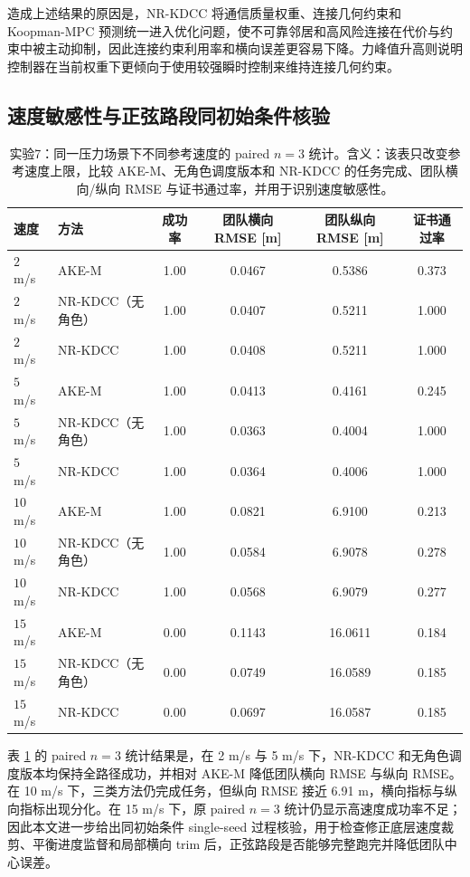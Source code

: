 \documentclass[twocolumn,3p,times,procedia]{elsarticle}
\newif\ifNRReview
\newcommand{\reviewblock}[1]{\ifNRReview\par\smallskip\noindent\begingroup\setlength{\fboxsep}{4pt}\colorbox{yellow!35}{\parbox{0.96\linewidth}{\footnotesize\textbf{当前不足：} #1}}\endgroup\par\smallskip\fi}
\newcommand{\AKE}{AKE-M}
\newcommand{\Method}{NR-KDCC}
\begin{document}
造成上述结果的原因是，\Method{} 将通信质量权重、连接几何约束和 Koopman-MPC 预测统一进入优化问题，使不可靠邻居和高风险连接在代价与约束中被主动抑制，因此连接约束利用率和横向误差更容易下降。力峰值升高则说明控制器在当前权重下更倾向于使用较强瞬时控制来维持连接几何约束。
\reviewblock{力峰值在多个场景中高于 \AKE{}，最终稿不能写“受力更小”或“载荷受力更平滑”；需要后续按 $F_x,F_y,M_z$ 分量和力平滑权重继续调。}

\subsection{速度敏感性与正弦路段同初始条件核验}

\begin{table}[!t]
\centering
\caption{实验7：同一压力场景下不同参考速度的 paired $n=3$ 统计。含义：该表只改变参考速度上限，比较 \AKE{}、无角色调度版本和 \Method{} 的任务完成、团队横向/纵向 RMSE 与证书通过率，并用于识别速度敏感性。}
\label{tab:speed_sensitivity}
\footnotesize
\begin{tabular}{llcccc}
\toprule
速度 & 方法 & 成功率 & 团队横向 RMSE [m] & 团队纵向 RMSE [m] & 证书通过率 \\
\midrule
$2$ m/s & \AKE{} & 1.00 & 0.0467 & 0.5386 & 0.373\\
$2$ m/s & \Method{}（无角色） & 1.00 & 0.0407 & 0.5211 & 1.000\\
$2$ m/s & \Method{} & 1.00 & 0.0408 & 0.5211 & 1.000\\
$5$ m/s & \AKE{} & 1.00 & 0.0413 & 0.4161 & 0.245\\
$5$ m/s & \Method{}（无角色） & 1.00 & 0.0363 & 0.4004 & 1.000\\
$5$ m/s & \Method{} & 1.00 & 0.0364 & 0.4006 & 1.000\\
$10$ m/s & \AKE{} & 1.00 & 0.0821 & 6.9100 & 0.213\\
$10$ m/s & \Method{}（无角色） & 1.00 & 0.0584 & 6.9078 & 0.278\\
$10$ m/s & \Method{} & 1.00 & 0.0568 & 6.9079 & 0.277\\
$15$ m/s & \AKE{} & 0.00 & 0.1143 & 16.0611 & 0.184\\
$15$ m/s & \Method{}（无角色） & 0.00 & 0.0749 & 16.0589 & 0.185\\
$15$ m/s & \Method{} & 0.00 & 0.0697 & 16.0587 & 0.185\\
\bottomrule
\end{tabular}
\end{table}

表 \ref{tab:speed_sensitivity} 的 paired $n=3$ 统计结果是，在 2 m/s 与 5 m/s 下，\Method{} 和无角色调度版本均保持全路径成功，并相对 \AKE{} 降低团队横向 RMSE 与纵向 RMSE。在 10 m/s 下，三类方法仍完成任务，但纵向 RMSE 接近 6.91 m，横向指标与纵向指标出现分化。在 15 m/s 下，原 paired $n=3$ 统计仍显示高速度成功率不足；因此本文进一步给出同初始条件 single-seed 过程核验，用于检查修正底层速度裁剪、平衡进度监督和局部横向 trim 后，正弦路段是否能够完整跑完并降低团队中心误差。
\end{document}
